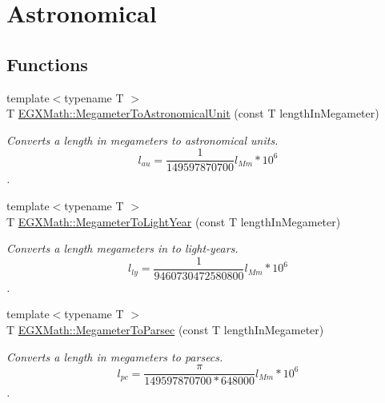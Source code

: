 \hypertarget{group___e_g_x_math-_conversions-_length_conversions-_megameter-_astronomical}{}\section{Astronomical}
\label{group___e_g_x_math-_conversions-_length_conversions-_megameter-_astronomical}
\subsection*{Functions}
\begin{DoxyCompactItemize}
\item 
{\footnotesize template$<$typename T $>$ }\\T \mbox{\hyperlink{group___e_g_x_math-_conversions-_length_conversions-_megameter-_astronomical_gac7cc4e20e973762cb87a8934184cdf6d}{E\+G\+X\+Math\+::\+Megameter\+To\+Astronomical\+Unit}} (const T length\+In\+Megameter)
\begin{DoxyCompactList}\small\item\em Converts a length in megameters to astronomical units. \[ l_{au}= \frac{1}{149597870700} l_{Mm} * 10^{6} \]. \end{DoxyCompactList}\item 
{\footnotesize template$<$typename T $>$ }\\T \mbox{\hyperlink{group___e_g_x_math-_conversions-_length_conversions-_megameter-_astronomical_ga6f5018465cf15f75912695e069b86795}{E\+G\+X\+Math\+::\+Megameter\+To\+Light\+Year}} (const T length\+In\+Megameter)
\begin{DoxyCompactList}\small\item\em Converts a length megameters in to light-\/years. \[ l_{ly}= \frac{1}{9460730472580800} l_{Mm} * 10^{6} \]. \end{DoxyCompactList}\item 
{\footnotesize template$<$typename T $>$ }\\T \mbox{\hyperlink{group___e_g_x_math-_conversions-_length_conversions-_megameter-_astronomical_gaec774451afc484c6fa69d2cfcd3dbf06}{E\+G\+X\+Math\+::\+Megameter\+To\+Parsec}} (const T length\+In\+Megameter)
\begin{DoxyCompactList}\small\item\em Converts a length in megameters to parsecs. \[ l_{pc}=\frac{\pi}{149597870700 * 648000} l_{Mm} * 10^{6} \]. \end{DoxyCompactList}\end{DoxyCompactItemize}



